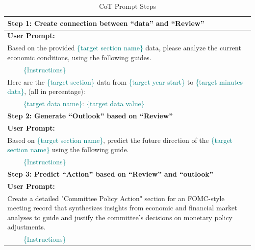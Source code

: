 \begin{table}[h]
    \centering
    \footnotesize
    \begin{tabular}{p{14cm}}
    \toprule
    \textbf{Step 1: Create connection between ``data'' and ``Review''} \\ 
    \hline
    \textbf{User Prompt:}\\ 
    \hline
    Based on the provided \textcolor{teal}{\{target section name\}} data, please analyze the current economic conditions, using the following guides.\\ 
    $\qquad$ \textcolor{teal}{ \{Instructions\} }
    ~\\
    Here are the \textcolor{teal}{\{target section\}} data from \textcolor{teal}{\{target year start\}} to \textcolor{teal}{\{target minutes data\}}, (all in percentage):\\ $\qquad$ \textcolor{teal}{\{target data name\}}: \textcolor{teal}{\{target data value\}}          \\ 
    \bottomrule
    \toprule
    \textbf{Step 2: Generate ``Outlook'' based on ``Review''} \\ 
    \hline
    \textbf{User Prompt:}\\ 
    \hline
    Based on \textcolor{teal}{\{target section name\}}, predict the future direction of the \textcolor{teal}{\{target section name\}} using the following guide. \\ 
    $\qquad$ \textcolor{teal}{ \{Instructions\}}           \\ 
    \bottomrule
    \toprule
    \textbf{Step 3: Predict ``Action'' based on ``Review'' and ``outlook''} \\ 
    \hline
    \textbf{User Prompt:}\\ 
    \hline
    Create a detailed "Committee Policy Action" section for an FOMC-style meeting record that synthesizes insights from economic and financial market analyses to guide and justify the committee's decisions on monetary policy adjustments.\\
     $\qquad$ \textcolor{teal}{\{Instructions\}}      \\ 
    \bottomrule
    \end{tabular}
    \caption{CoT Prompt Steps}
    \label{tab:ch2:cot_prompt}
\end{table}

